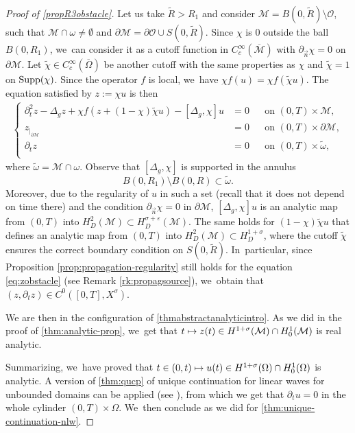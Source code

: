 \documentclass[JEP,XML,SOM,Unicode,published]{cedram}
\newcommand\mto{\mathchoice{\longmapsto}{\mapsto}{\mapsto}{\mapsto}}
\theoremstyle{definition}
\let\mc\mathcal
\let\veps\varepsilon
\newcommand{\M}{\mc{M}}
\renewcommand{\O}{\mc{O}}
\begin{document}
\begin{proof}[Proof of \cref{propR3obstacle}]
Let us take $\widetilde{R}>R_1$ and consider $\M=B(0,\widetilde{R})\setminus \O$, such that $\M\cap\omega\neq \emptyset$ and $\partial \M=\partial \O\cup S(0,\widetilde{R})$. Since $\chi$ is $0$ outside the ball $B(0, R_1)$, we~can consider it as a cutoff function in $C_c^\infty(\overline{\M})$ with $\partial_{\vec n}\chi=0$ on $\partial\M$. Let $\widetilde{\chi}\in C_c^\infty(\overline{\Omega})$ be another cutoff with the same properties as $\chi$ and $\widetilde{\chi}=1$ on $\textnormal{Supp}(\chi)$. Since the operator $f$ is local, we~have $\chi f(u)=\chi f(\widetilde{\chi}u)$. The equation satisfied by $z:=\chi u$ is then
\begin{align}
\label{eq:zobstacle}
\left\{\begin{aligned}
\partial_t^2 z-\Delta_g z+\chi f(z+(1-\chi)\widetilde{\chi}u)-[\Delta_g, \chi]u&=0 &&\text{on }(0, T)\times \M, \\
z_{|_{\partial \M}}&=0 &&\text{on }(0, T)\times \partial\M, \\
\partial_t z&=0 &&\text{on }(0, T)\times \widetilde{\omega},\\
\end{aligned}\right.
\end{align}
where $\widetilde{\omega}=\M\cap\omega$. Observe that $[\Delta_g, \chi]$ is supported in the annulus
\[
B(0, R_1)\setminus B(0, R)\subset \widetilde{\omega}.
\]
Moreover, due to the regularity of $u$ in such a set (recall that it does not depend on time there) and the condition $\partial_{\vec n} \chi=0$ in $\partial\M$, $[\Delta_g, \chi]u$ is an analytic map from $(0, T)$ into $H_D^{2}(\M)\subset H_D^{\sigma+\veps}(\M)$. The same holds for $(1-\chi)\widetilde{\chi}u$ that defines an analytic map from $(0, T)$ into $H_D^{2}(\M)\subset H_D^{1+\sigma}$, where the cutoff $\widetilde{\chi}$ ensures the correct boundary condition on $S(0,\widetilde{R})$. In~particular, since Proposition \eqref{prop:propagation-regularity} still holds for the equation \eqref{eq:zobstacle} (see Remark \ref{rk:propagsource}), we~obtain that $(z, \partial_t z)\in C^0([0, T], X^\sigma)$.

We are then in the configuration of \cref{thmabstractanalyticintro}. As we did in the proof of \cref{thm:analytic-prop}, we~get that $t\mto z(t)\in H^{1+\sigma}(\M)\cap H_0^1(\M)$ is real analytic.

Summarizing, we~have proved that $t\in (0, t)\mto u(t)\in H^{1+\sigma}(\Omega)\cap H_0^1(\Omega)$ is analytic. A version of \cref{thm:qucp} of unique continuation for linear waves for unbounded domains can be applied (see \cite[Cor.\,3.12]{JL13}), from which we get that $\partial_t u=0$ in the whole cylinder $(0, T)\times \Omega$. We~then conclude as we did for \cref{thm:unique-continuation-nlw}.
\end{proof}
\end{document}
